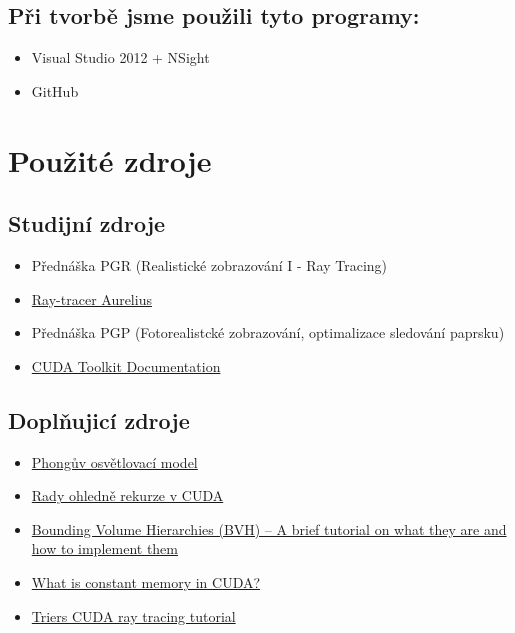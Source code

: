 \documentclass[12pt,a4paper,titlepage,final]{report}
\begin{document}
\subsection{Při tvorbě jsme použili tyto programy:}
\begin{itemize}
	\item Visual Studio 2012 + NSight
	\item GitHub
\end{itemize}
\section{Použité zdroje}

\subsection{Studijní zdroje}
\begin{itemize}
	\item Přednáška PGR (Realistické zobrazování I - Ray Tracing)
	\item \href{https://www.fit.vutbr.cz/study/courses/PGR/private/Aurelius.zip}{Ray-tracer Aurelius}
	\item Přednáška PGP (Fotorealistcké zobrazování, optimalizace sledování paprsku)
	\item \href{http://docs.nvidia.com/cuda}{CUDA Toolkit Documentation}
\end{itemize}

\subsection{Doplňujicí zdroje}
\begin{itemize}
	\item \href{http://cs.wikipedia.org/wiki/Phong%C5%AFv_osv%C4%9Btlovac%C3%AD_model}{Phongův osvětlovací model}
	\item \href{http://stackoverflow.com/questions/19013156/how-does-cuda-4-0-support-recursion}{Rady ohledně rekurze v CUDA}
	\item \href{http://www.3dmuve.com/3dmblog/?p=182}{Bounding Volume Hierarchies (BVH) – A brief tutorial on what they are and how to implement them}
	\item \href{http://cuda-programming.blogspot.cz/2013/01/what-is-constant-memory-in-cuda.html}{What is constant memory in CUDA?}
	\item \href{http://cg.alexandra.dk/2009/08/10/triers-cuda-ray-tracing-tutorial/}{Triers CUDA ray tracing tutorial}
\end{itemize}
\end{document}
